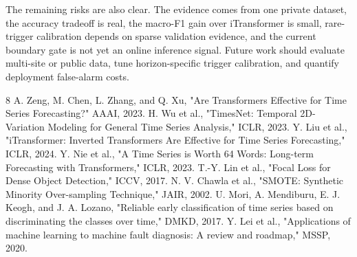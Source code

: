 \documentclass[12pt]{article}
\begin{document}
The remaining risks are also clear. The evidence comes from one private dataset, the accuracy tradeoff is real, the macro-F1 gain over iTransformer is small, rare-trigger calibration depends on sparse validation evidence, and the current boundary gate is not yet an online inference signal. Future work should evaluate multi-site or public data, tune horizon-specific trigger calibration, and quantify deployment false-alarm costs.

        \begin{thebibliography}{8}
        \small
         A. Zeng, M. Chen, L. Zhang, and Q. Xu, "Are Transformers Effective for Time Series Forecasting?" AAAI, 2023.
 H. Wu et al., "TimesNet: Temporal 2D-Variation Modeling for General Time Series Analysis," ICLR, 2023.
 Y. Liu et al., "iTransformer: Inverted Transformers Are Effective for Time Series Forecasting," ICLR, 2024.
 Y. Nie et al., "A Time Series is Worth 64 Words: Long-term Forecasting with Transformers," ICLR, 2023.
 T.-Y. Lin et al., "Focal Loss for Dense Object Detection," ICCV, 2017.
 N. V. Chawla et al., "SMOTE: Synthetic Minority Over-sampling Technique," JAIR, 2002.
 U. Mori, A. Mendiburu, E. J. Keogh, and J. A. Lozano, "Reliable early classification of time series based on discriminating the classes over time," DMKD, 2017.
 Y. Lei et al., "Applications of machine learning to machine fault diagnosis: A review and roadmap," MSSP, 2020.
        \end{thebibliography}
        
\end{document}
